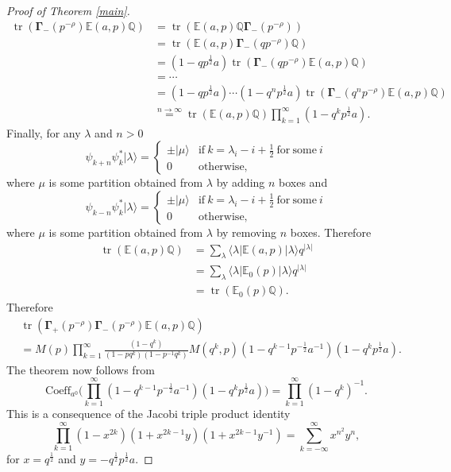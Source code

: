 \documentclass{amsart}
\theoremstyle{definition}
\newcommand{\QQ} {\mathbb{Q}}		%
\newcommand{\bfGamma} {\mathbf{\Gamma}}
\newcommand{\EE}{\mathbb{E}}
\newcommand{\tr}{\operatorname{tr}}
\begin{document}
\begin{proof}[Proof of Theorem \ref{main}]
\begin{align*}
\tr(\bfGamma_-(p^{-\rho}) \EE(a,p) \QQ) &= \tr(\EE(a,p) \QQ \bfGamma_-(p^{-\rho})) \\ 
&= \tr(\EE(a,p) \bfGamma_-(q p^{-\rho}) \QQ ) \\ 
&= (1-q p^{\frac{1}{2}} a) \tr(\bfGamma_-(q p^{-\rho}) \EE(a,p) \QQ ) \\ 
&= \cdots \\
&= (1-q p^{\frac{1}{2}} a) \cdots (1-q^n p^{\frac{1}{2}} a) \tr(\bfGamma_-(q^n p^{-\rho}) \EE(a,p) \QQ ) \\
&\stackrel{n \rightarrow \infty}{=} \tr(\EE(a,p) \QQ ) \prod_{k=1}^{\infty} (1-q^k p^{\frac{1}{2}} a).
\end{align*}
Finally, for any $\lambda$ and $n>0$
$$
\psi_{k+n} \psi_{k}^{*} | \lambda \rangle = \left\{ \begin{array}{cc} \pm |\mu \rangle & \mathrm{if \ } k = \lambda_i - i + \frac{1}{2} \mathrm{ \ for \ some \ } i \\ 0 & \mathrm{otherwise}, \end{array} \right.
$$
where $\mu$ is some partition obtained from $\lambda$ by adding $n$ boxes and
$$
\psi_{k-n} \psi_{k}^{*} | \lambda \rangle = \left\{ \begin{array}{cc} \pm |\mu \rangle & \mathrm{if \ } k = \lambda_i - i + \frac{1}{2} \mathrm{ \ for \ some \ } i \\ 0 & \mathrm{otherwise}, \end{array} \right.
$$
where $\mu$ is some partition obtained from $\lambda$ by removing $n$ boxes. Therefore
\begin{align*}
\tr(\EE(a,p) \QQ ) &= \sum_\lambda \langle \lambda | \EE(a,p) | \lambda  \rangle q^{|\lambda|} \\
&= \sum_\lambda \langle \lambda | \EE_0(p) | \lambda  \rangle q^{|\lambda|} \\
&=\tr(\EE_0(p) \QQ).
\end{align*}
Therefore
\begin{align*}
&\tr(\bfGamma_+(p^{-\rho}) \bfGamma_-(p^{-\rho}) \EE(a,p) \QQ) \\
&= M(p) \prod_{k=1}^{\infty} \frac{(1-q^k)}{(1-p q^k)(1-p^{-1} q^k)}  M(q^{k},p) (1-q^{k-1} p^{-\frac{1}{2}} a^{-1})(1-q^{k} p^{\frac{1}{2}} a).
\end{align*}
The theorem now follows from
$$
\mathrm{Coeff}_{a^0}\bigg(\prod_{k=1}^{\infty} (1-q^{k-1} p^{-\frac{1}{2}} a^{-1})(1-q^{k} p^{\frac{1}{2}} a) \bigg) = \prod_{k=1}^{\infty} (1-q^k)^{-1}.
$$
This is a consequence of the Jacobi triple product identity
$$
\prod_{k=1}^{\infty} (1-x^{2k})(1+x^{2k-1} y)(1+x^{2k-1} y^{-1}) = \sum_{k=-\infty}^{\infty} x^{n^2} y^{n},
$$
for $x = q^{\frac{1}{2}}$ and $y = - q^{\frac{1}{2}} p^{\frac{1}{2}} a$.
\end{proof}
     
\end{document}
